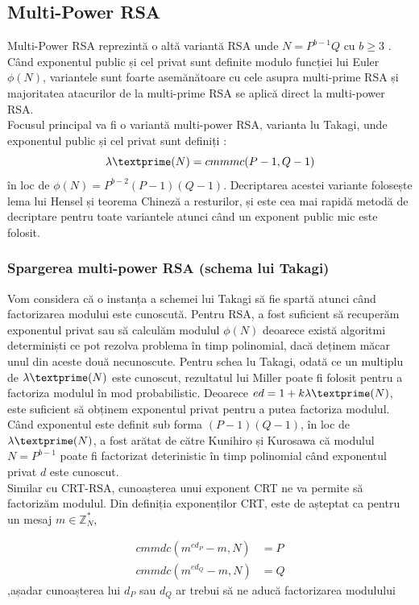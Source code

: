 \documentclass[12pt, oneside]{book}
\begin{document}
\subsection{Multi-Power RSA}
Multi-Power RSA reprezintă o altă variantă RSA unde $N=P^{b-1}Q$ cu $b\geqslant 3$ .\\
Când exponentul public și cel privat sunt definite modulo funcției lui Euler $\phi(N)$, variantele sunt foarte asemănătoare cu cele asupra multi-prime RSA și majoritatea atacurilor de la multi-prime RSA se aplică direct la multi-power RSA. \\
Focusul principal va fi o variantă multi-power RSA, varianta lu Takagi, unde exponentul public și cel privat sunt definiți :
$$ \lambda \textprime (N) = cmmmc(P-1,Q-1) $$
în loc de $\phi(N) = P^{b-2}(P-1)(Q-1)$. Decriptarea acestei variante folosește lema lui Hensel și teorema Chineză a resturilor, și este cea mai rapidă metodă de decriptare pentru toate variantele atunci când un exponent public mic este folosit. \\
\subsubsection{Spargerea multi-power RSA (schema lui Takagi)}
Vom considera că o instanța a schemei lui Takagi să fie spartă atunci când factorizarea modului este cunoscută. Pentru RSA, a fost suficient să recuperăm exponentul privat sau să calculăm modulul $\phi(N)$ deoarece există algoritmi determiniști ce pot rezolva problema în timp polinomial, dacă deținem măcar unul din aceste două necunoscute. Pentru schea lu Takagi, odată ce un multiplu de $\lambda \textprime (N)$ este cunoscut, rezultatul lui Miller \cite{Milner3} poate fi folosit pentru a factoriza modulul în mod probabilistic. Deoarece $ed= 1 + k \lambda \textprime (N)$, este suficient să obținem exponentul privat pentru a putea factoriza modulul. Când exponentul este definit sub forma $(P-1)(Q-1)$, în loc de $\lambda \textprime (N)$, a fost arătat de către Kunihiro și Kurosawa \cite{Kunihiro} că modulul $N=P^{b-1}$ poate fi factorizat deterinistic în timp polinomial când exponentul privat $d$ este cunoscut. \\
Similar cu CRT-RSA, cunoașterea unui exponent CRT ne va permite să factorizăm modulul. Din definiția exponenților CRT, este de așteptat ca pentru un mesaj $ m \in \mathbb{Z}_{N}^{*}$,

\begin{align*}
cmmdc(m^{ed_P} -m ,N) &=P \\
cmmdc(m^{ed_Q} -m ,N) &=Q
\end{align*} 
,așadar cunoașterea lui $d_P$ sau $d_Q$ ar trebui să ne aducă factorizarea modulului
\end{document}
